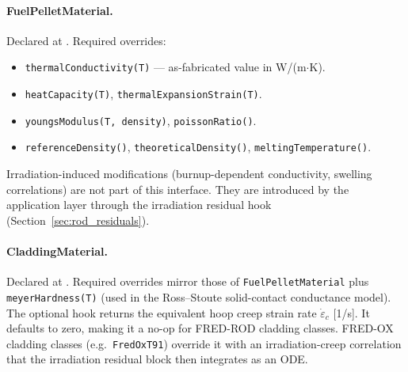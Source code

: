 \documentclass[11pt,a4paper]{article}
\begin{document}
\paragraph{FuelPelletMaterial.}
Declared at .  Required overrides:
\begin{itemize}
  \item \texttt{thermalConductivity(T)} — as-fabricated value in W/(m$\cdot$K).
  \item \texttt{heatCapacity(T)}, \texttt{thermalExpansionStrain(T)}.
  \item \texttt{youngsModulus(T, density)}, \texttt{poissonRatio()}.
  \item \texttt{referenceDensity()}, \texttt{theoreticalDensity()}, \texttt{meltingTemperature()}.
\end{itemize}
Irradiation-induced modifications (burnup-dependent conductivity, swelling correlations) are not part of this interface.  They are introduced by the application layer through the irradiation residual hook (Section~\ref{sec:rod_residuals}).

\paragraph{CladdingMaterial.}
Declared at .  Required overrides mirror those of \texttt{FuelPelletMaterial} plus \texttt{meyerHardness(T)} (used in the Ross--Stoute solid-contact conductance model).  The optional hook  returns the equivalent hoop creep strain rate $\dot{\varepsilon}_{c}$ [1/s].  It defaults to zero, making it a no-op for FRED-ROD cladding classes.  FRED-OX cladding classes (e.g.\ \texttt{FredOxT91}) override it with an irradiation-creep correlation that the irradiation residual block then integrates as an ODE.
\end{document}
